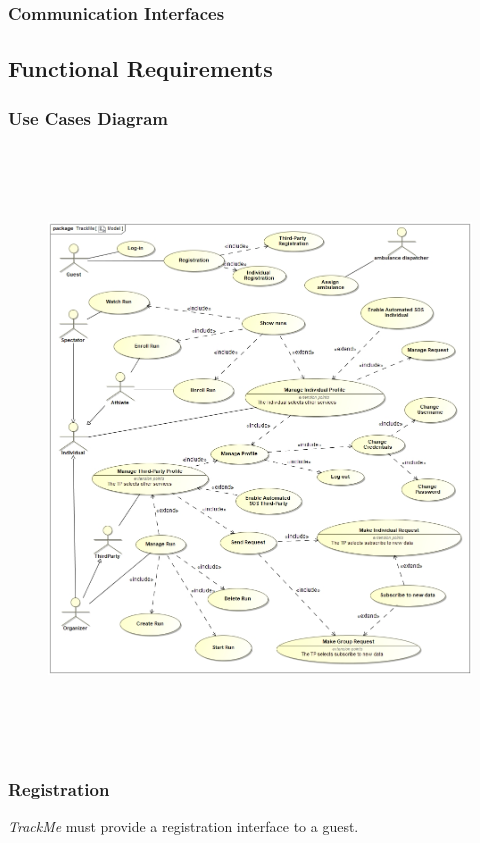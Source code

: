 \documentclass[a4paper]{article}
\begin{document}
        \subsubsection{Communication Interfaces}
    \newpage
    \subsection{Functional Requirements}
        \subsubsection{Use Cases Diagram}
        \begin{figure}[!htpb]
    	\centering
    	\includegraphics[width=\textwidth,height=160mm]{images/UML/Model.jpg}
        \end{figure}
        \newpage
        \subsubsection{Registration}
        \textit{TrackMe} must provide a registration interface to a guest. 
        
\end{document}
